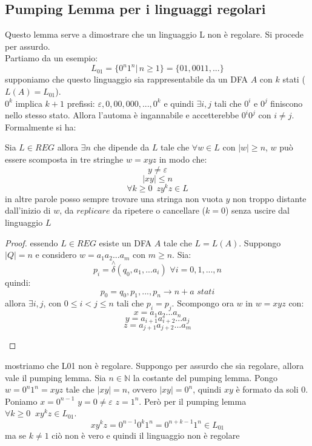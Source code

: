 \documentclass[a4paper,12pt, oneside]{book}
\begin{document}
\subsection{Pumping Lemma per i linguaggi regolari}
Questo lemma serve a dimostrare che un linguaggio L non è regolare. Si procede per assurdo.\\
Partiamo da un esempio:
$$L_{01}=\{0^n1^n|\,n\geq 1\}=\{01,0011,...\}$$
supponiamo che questo linguaggio sia rappresentabile da un DFA $A$ con $k$ stati ($L(A)=L_{01}$).\\
$0^k$ implica $k+1$ prefissi: $\varepsilon,0,00,000,...,0^k$ e quindi $\exists i,j$ tali che $0^i$ e $0^j$ finiscono nello stesso stato. Allora l'automa è ingannabile e accetterebbe $0^i0^j$ con $i\neq j$.\\
Formalmente si ha:
\begin{teorema}
Sia $L\in REG$ allora $\exists n$ che dipende da $L$ tale che $\forall w\in L$ con $|w|\geq n$, $w$ può essere scomposta in tre stringhe $w=xyz$ in modo che:
$$y\neq \varepsilon$$
$$|xy|\leq n$$
$$\forall k\geq 0\,\,\, zy^kz\in L$$
in altre parole posso sempre trovare una stringa non vuota $y$ non troppo distante dall'inizio di $w$, da $replicare$ da ripetere o cancellare ($k=0$) senza uscire dal linguaggio $L$
\end{teorema}
\begin{proof}
essendo $L\in REG$ esiste un DFA $A$ tale che $L=L(A)$. Suppongo $|Q|=n$ e considero $w=a_1a_2...a_m$ con $m\geq n$. Sia:
$$p_i=\stackrel{\wedge}{\delta}(q_0,a_1,...a_i)\,\,\forall i=0,1,...,n$$
quindi:
$$p_0=q_0,p_1,...,p_n\to n+a\,\,stati$$
allora $\exists i,j$, con $0\leq i<j\leq n$ tali che $p_i=p_j$. Scompongo ora $w$ in $w=xyz$ con:
$$x=a_1a_2...a_n$$
$$y=a_{i+1}a_{i+2}...a_j$$
$$z=a_{j+1}a_{j+2}...a_m$$
\begin{center}
\end{center}
\end{proof}
\begin{esempio}
mostriamo che L01 non è regolare. Suppongo per assurdo che sia regolare, allora vale il pumping lemma. Sia $n\in\mathbb{N}$ la costante del pumping lemma. Pongo $w=0^n1^n=xyz$ tale che $|xy|=n$, ovvero $|xy|=0^n$, quindi $xy$ è formato da soli 0. Poniamo $x=0^{n-1}\,\,y=0\neq \varepsilon\,\, z=1^n$. Però per il pumping lemma $\forall k\geq 0\,\,\ xy^kz\in L_{01}$.
$$xy^kz=0^{n-1}0^k1^n=0^{n+k-1}1^n\in L_{01}$$
ma se $k\neq 1$ ciò non è vero e quindi il linguaggio non è regolare
\end{esempio}
\end{document}
